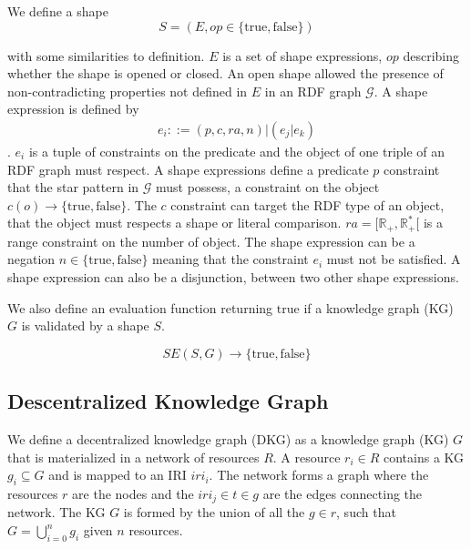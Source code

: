 We define a shape
\begin{equation}
S = (E, op \in \{\mathrm{true},\mathrm{false}\})
\end{equation}

with some similarities to \citeauthor{Abbas2018} definition.
$E$ is a set of shape expressions, $op$ describing whether the shape is opened or closed.
An open shape allowed the presence of non-contradicting properties not defined in $E$ in an RDF graph $\mathcal{G}$.
A shape expression is defined by
\begin{align}
 e_i ::= (p, c, ra, n) | (e_j|e_k)
\end{align}
.
$e_i$ is a tuple of constraints on the predicate and the object of one triple of an RDF graph must respect. 
A shape expressions define a predicate $p$ constraint that the star pattern in $\mathcal{G}$ must possess,
a constraint on the object $c(o) \rightarrow \{\mathrm{true}, \mathrm{false}\}$.
The $c$ constraint can target the RDF type of an object, that the object must respects a shape or literal comparison.
$ra = [\mathbb{R}_+, \mathbb{R}_{+}^{*}[$ is a range constraint on the number of object.
The shape expression can be a negation $n \in \{\mathrm{true}, \mathrm{false}\}$ meaning that the constraint $e_i$ must not be satisfied.
A shape expression can also be a disjunction, between two other shape expressions.

We also define an evaluation function returning $\mathrm{true}$ if a knowledge graph (KG) $G$ is validated by a shape $S$. 

\begin{equation}
    SE(S, G) \rightarrow \{\mathrm{true}, \mathrm{false}\}
\end{equation}


\subsection{Descentralized Knowledge Graph}
We define a decentralized knowledge graph (DKG) as a knowledge graph (KG) $G$ that is materialized in a network of resources $R$.
A resource $r_i \in R$ contains a KG $g_i \subseteq G$ and is mapped to an IRI $iri_i$.
The network forms a graph where the resources $r$ are the nodes and the $iri_j \in t \in g$ are the edges connecting the network.
The KG $G$ is formed by the union of all the $g \in r$, such that $G = \bigcup_{i=0}^{n}g_i$ given $n$ resources.